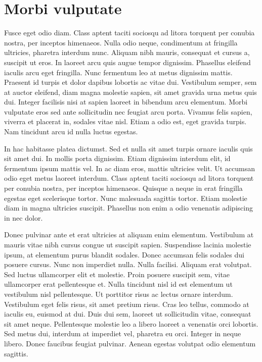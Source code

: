 \documentclass{EPUProjetDi}
\begin{document}
\section{Morbi vulputate}

Fusce eget odio diam. Class aptent taciti sociosqu ad litora torquent per conubia nostra, per inceptos himenaeos. Nulla odio neque, condimentum at fringilla ultricies, pharetra interdum nunc. Aliquam nibh mauris, consequat et cursus a, suscipit ut eros. In laoreet arcu quis augue tempor dignissim. Phasellus eleifend iaculis arcu eget fringilla. Nunc fermentum leo at metus dignissim mattis. Praesent id turpis et dolor dapibus lobortis ac vitae dui. Vestibulum semper, sem at auctor eleifend, diam magna molestie sapien, sit amet gravida urna metus quis dui. Integer facilisis nisi at sapien laoreet in bibendum arcu elementum. Morbi vulputate eros sed ante sollicitudin nec feugiat arcu porta. Vivamus felis sapien, viverra et placerat in, sodales vitae nisl. Etiam a odio est, eget gravida turpis. Nam tincidunt arcu id nulla luctus egestas.

In hac habitasse platea dictumst. Sed et nulla sit amet turpis ornare iaculis quis sit amet dui. In mollis porta dignissim. Etiam dignissim interdum elit, id fermentum ipsum mattis vel. In ac diam eros, mattis ultricies velit. Ut accumsan odio eget metus laoreet interdum. Class aptent taciti sociosqu ad litora torquent per conubia nostra, per inceptos himenaeos. Quisque a neque in erat fringilla egestas eget scelerisque tortor. Nunc malesuada sagittis tortor. Etiam molestie diam in magna ultricies suscipit. Phasellus non enim a odio venenatis adipiscing in nec dolor.

Donec pulvinar ante et erat ultricies at aliquam enim elementum. Vestibulum at mauris vitae nibh cursus congue ut suscipit sapien. Suspendisse lacinia molestie ipsum, at elementum purus blandit sodales. Donec accumsan felis sodales dui posuere cursus. Nunc non imperdiet nulla. Nulla facilisi. Aliquam erat volutpat. Sed luctus ullamcorper elit et molestie. Proin posuere suscipit sem, vitae ullamcorper erat pellentesque et. Nulla tincidunt nisl id est elementum ut vestibulum nisl pellentesque. Ut porttitor risus ac lectus ornare interdum. Vestibulum eget felis risus, sit amet pretium risus. Cras leo tellus, commodo at iaculis eu, euismod at dui. Duis dui sem, laoreet ut sollicitudin vitae, consequat sit amet neque. Pellentesque molestie leo a libero laoreet a venenatis orci lobortis. Sed metus dui, interdum at imperdiet vel, pharetra eu orci. Integer in neque libero. Donec faucibus feugiat pulvinar. Aenean egestas volutpat odio elementum sagittis.
\end{document}
